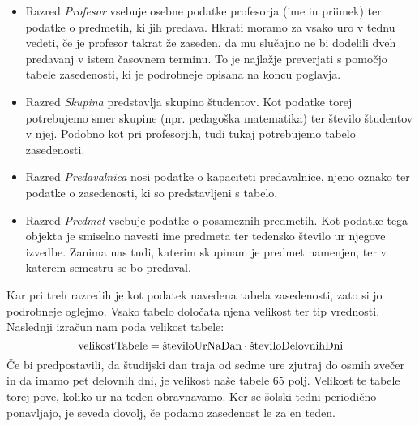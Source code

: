 \documentclass[10pt, a4paper]{article}
\begin{document}

\begin{itemize}

   \item Razred \emph{Profesor} vsebuje osebne podatke profesorja (ime in priimek) ter
   podatke o predmetih, ki jih predava. Hkrati moramo za vsako uro v tednu vedeti, če
   je profesor takrat že zaseden, da mu slučajno ne bi dodelili dveh predavanj v istem
   časovnem terminu. To je najlažje preverjati s pomočjo tabele zasedenosti, ki je
   podrobneje opisana na koncu poglavja.

   \item Razred \emph{Skupina} predstavlja skupino študentov. Kot podatke torej potrebujemo
   smer skupine (npr. pedagoška matematika) ter število študentov v njej. Podobno kot pri
   profesorjih, tudi tukaj potrebujemo tabelo zasedenosti.

   \item Razred \emph{Predavalnica} nosi podatke o kapaciteti predavalnice, njeno oznako
   ter podatke o zasedenosti, ki so predstavljeni s tabelo.

   \item Razred \emph{Predmet} vsebuje podatke o posameznih predmetih. Kot podatke tega
   objekta je smiselno navesti ime predmeta ter tedensko število ur njegove izvedbe.
   Zanima nas tudi, katerim skupinam je predmet namenjen, ter v katerem semestru se bo
   predaval.

\end{itemize}
Kar pri treh razredih je kot podatek navedena tabela zasedenosti, zato si jo podrobneje
oglejmo. Vsako tabelo določata njena velikost ter tip vrednosti. Naslednji izračun nam
poda velikost tabele:
\[
\textnormal{velikostTabele} = \textnormal{številoUrNaDan}\cdot \textnormal{številoDelovnihDni}
\]
Če bi predpostavili, da študijski dan traja od sedme ure zjutraj do osmih zvečer in da
imamo pet delovnih dni, je velikost naše tabele 65 polj. Velikost te tabele torej pove,
koliko ur na teden obravnavamo. Ker se šolski tedni periodično ponavljajo, je seveda
dovolj, če podamo zasedenost le za en teden.
\end{document}
